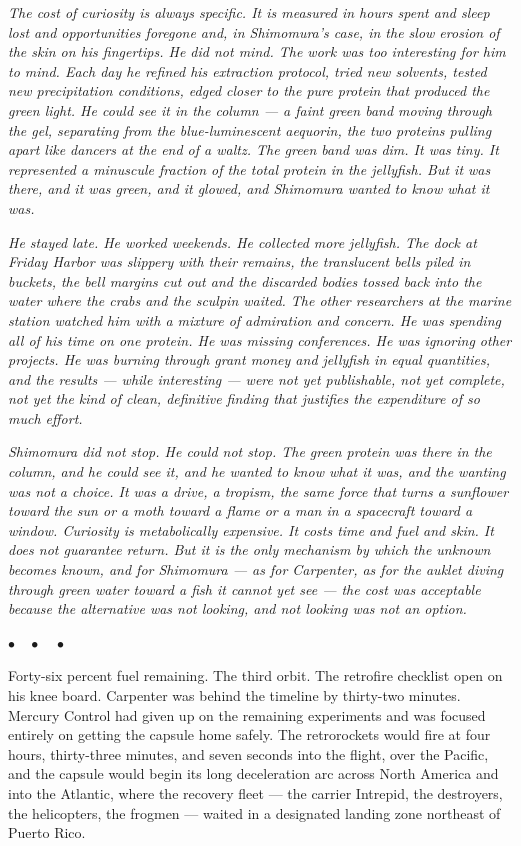 \documentclass[12pt, letterpaper]{article}
\begin{document}
\emph{The cost of curiosity is always specific. It is measured in hours spent and sleep lost and opportunities foregone and, in Shimomura's case, in the slow erosion of the skin on his fingertips. He did not mind. The work was too interesting for him to mind. Each day he refined his extraction protocol, tried new solvents, tested new precipitation conditions, edged closer to the pure protein that produced the green light. He could see it in the column --- a faint green band moving through the gel, separating from the blue-luminescent aequorin, the two proteins pulling apart like dancers at the end of a waltz. The green band was dim. It was tiny. It represented a minuscule fraction of the total protein in the jellyfish. But it was there, and it was green, and it glowed, and Shimomura wanted to know what it was.}

\emph{He stayed late. He worked weekends. He collected more jellyfish. The dock at Friday Harbor was slippery with their remains, the translucent bells piled in buckets, the bell margins cut out and the discarded bodies tossed back into the water where the crabs and the sculpin waited. The other researchers at the marine station watched him with a mixture of admiration and concern. He was spending all of his time on one protein. He was missing conferences. He was ignoring other projects. He was burning through grant money and jellyfish in equal quantities, and the results --- while interesting --- were not yet publishable, not yet complete, not yet the kind of clean, definitive finding that justifies the expenditure of so much effort.}

\emph{Shimomura did not stop. He could not stop. The green protein was there in the column, and he could see it, and he wanted to know what it was, and the wanting was not a choice. It was a drive, a tropism, the same force that turns a sunflower toward the sun or a moth toward a flame or a man in a spacecraft toward a window. Curiosity is metabolically expensive. It costs time and fuel and skin. It does not guarantee return. But it is the only mechanism by which the unknown becomes known, and for Shimomura --- as for Carpenter, as for the auklet diving through green water toward a fish it cannot yet see --- the cost was acceptable because the alternative was not looking, and not looking was not an option.}

\begin{center}
$\bullet\quad\bullet\quad\bullet$
\end{center}

Forty-six percent fuel remaining. The third orbit. The retrofire checklist open on his knee board. Carpenter was behind the timeline by thirty-two minutes. Mercury Control had given up on the remaining experiments and was focused entirely on getting the capsule home safely. The retrorockets would fire at four hours, thirty-three minutes, and seven seconds into the flight, over the Pacific, and the capsule would begin its long deceleration arc across North America and into the Atlantic, where the recovery fleet --- the carrier Intrepid, the destroyers, the helicopters, the frogmen --- waited in a designated landing zone northeast of Puerto Rico.
\end{document}
